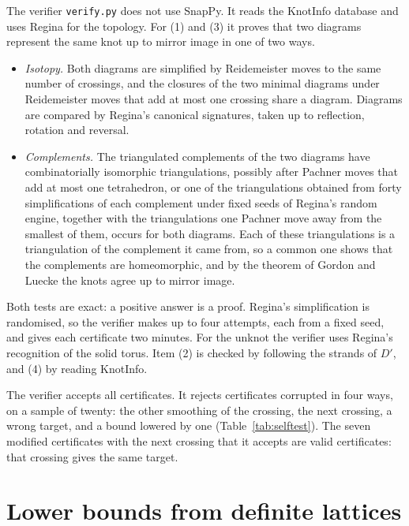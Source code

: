 \documentclass[11pt]{amsart}
\theoremstyle{definition}
\theoremstyle{remark}
\begin{document}
The verifier \texttt{verify.py} does not use SnapPy. It reads the KnotInfo database and
uses Regina \cite{Regina} for the topology. For (1) and (3) it proves that two diagrams
represent the same knot up to mirror image in one of two ways.
\begin{itemize}
\item \emph{Isotopy.} Both diagrams are simplified by Reidemeister moves to the same number
of crossings, and the closures of the two minimal diagrams under Reidemeister moves that add
at most one crossing share a diagram. Diagrams are compared by Regina's canonical
signatures, taken up to reflection, rotation and reversal.
\item \emph{Complements.} The triangulated complements of the two diagrams have
combinatorially isomorphic triangulations, possibly after Pachner moves that add at most one
tetrahedron, or one of the triangulations obtained from forty simplifications of each
complement under fixed seeds of Regina's random engine, together with the triangulations one
Pachner move away from the smallest of them, occurs for both diagrams. Each of these
triangulations is a triangulation of the complement it came from, so a common one shows that
the complements are homeomorphic, and by the theorem of Gordon and Luecke
\cite{GL} the knots agree up to mirror image.
\end{itemize}
Both tests are exact: a positive answer is a proof. Regina's simplification is
randomised, so the verifier makes up to four attempts, each from a fixed seed, and gives each
certificate two minutes. For the unknot the verifier uses
Regina's recognition of the solid torus. Item (2) is checked by following the strands of
$D'$, and (4) by reading KnotInfo.

The verifier accepts all \ncerts{} certificates. It rejects certificates
corrupted in four ways, on a sample of twenty: the other smoothing of the crossing, the next
crossing, a wrong target, and a bound lowered by one (Table~\ref{tab:selftest}). The seven
modified certificates with the next crossing that it accepts are valid certificates: that
crossing gives the same target.

\section{Lower bounds from definite lattices}\label{sec:lower}
\end{document}
